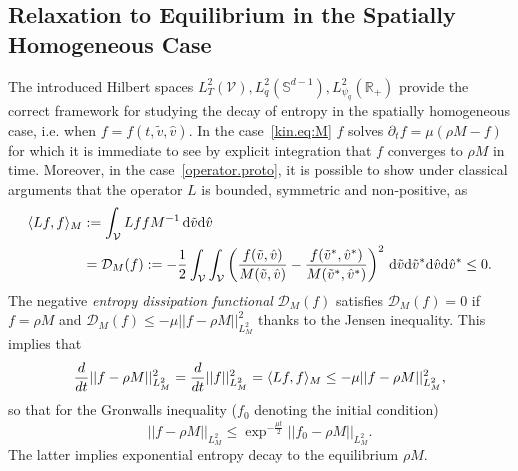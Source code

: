 \documentclass[a4paper]{article}
\theoremstyle{Theorem}\newtheorem{proposition}{Proposition}[section]
\theoremstyle{Remark}\newtheorem{remark}{Remark}[section]
\theoremstyle{Theorem}\newtheorem{theorem}{Theorem}[section]
\DeclarePairedDelimiter\ave{\langle}{\rangle}
\newcommand{\R}{\mathbb{R}}
\newcommand{\hv}{\hat{v}}
\newcommand{\tv}{\tilde{v}}
\newcommand{\intV}{\int_{\mathcal{V}}}
\begin{document}
\subsection{Relaxation to Equilibrium in the Spatially Homogeneous Case}\label{sec:entropy}
The introduced Hilbert spaces $L^2_T(\mathcal{V}),L^2_{q}(\mathbb{S}^{d-1}),L^2_{\psi_q}(\R_+)$ provide the correct framework for studying the decay of entropy in the spatially homogeneous case, i.e. when $f=f(t,\tv,\hv)$. In the case~\eqref{kin.eq:M} $f$ solves $\partial_t f =\mu(\rho M-f)$
for which it is immediate to see by explicit integration that $f$ converges to $\rho M$ in time.
Moreover, in the case~\eqref{operator.proto}, it is possible to show under classical arguments that the operator $L$ is bounded, symmetric and non-positive, as 
\begin{equation*}\label{prop.positive}
\begin{split}
\ave{Lf,f}_M &:= \intV Lf f M^{-1} \, {\rm d} \tv {\rm d} \hv \\
&= \mathcal{D}_M(f) := -\dfrac{1}{2}\intV \intV\left(\dfrac{f(\tv,\hv)}{M(\tv,\hv)}-\dfrac{f(\tv^*,\hv^*)}{M(\tv^*,\hv^*)}\right)^2 \, {\rm d}\tv {\rm d}\tv^* {\rm d}\hv {\rm d}\hv^* \le 0.
\end{split}
\end{equation*}
The negative \textit{entropy dissipation functional} $\mathcal{D}_M(f)$ satisfies $\mathcal{D}_M(f)=0$ if $f=\rho M$ and $\mathcal{D}_M(f) \le - \mu||f-\rho M||^2_{L^2_M}$ thanks to the Jensen inequality.  This implies that
\[
\dfrac{d}{dt} ||f-\rho M||^2_{L^2_M} = \dfrac{d}{dt}||f||^2_{L^2_M}  =\ave{Lf,f}_M \le - \mu||f-\rho M||^2_{L^2_M},
\]
so that for the Gronwalls inequality ($f_0$ denoting the initial condition)
\[
||f-\rho M||_{L^2_M} \le \exp^{-\frac{\mu t}{2}}||f_0-\rho M||_{L^2_M}.
\]
The latter implies exponential entropy decay to the equilibrium $\rho M$.
\end{document}
